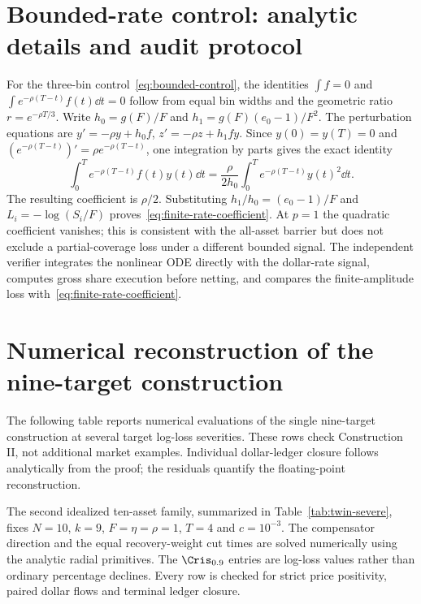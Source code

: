 \documentclass[review,hidelinks,onefignum,onetabnum]{siamonline250211}
\begin{document}
\section{Bounded-rate control: analytic details and audit protocol}\label{app:rate}
For the three-bin control~\eqref{eq:bounded-control}, the identities $\int f=0$ and $\int e^{-\rho(T-t)}f(t)\dd t=0$ follow from equal bin widths and the geometric ratio $r=e^{-\rho T/3}$. Write $h_0=g(F)/F$ and $h_1=g(F)(e_0-1)/F^2$. The perturbation equations are $y'=-\rho y+h_0 f$, $z'=-\rho z+h_1fy$. Since $y(0)=y(T)=0$ and $(e^{-\rho(T-t)})'=\rho e^{-\rho(T-t)}$, one integration by parts gives the exact identity
\begin{equation}\label{eq:ibp}
\int_0^T e^{-\rho(T-t)}f(t)y(t)\dd t
=\frac{\rho}{2h_0}\int_0^T e^{-\rho(T-t)}y(t)^2\dd t.
\end{equation}
The resulting coefficient is $\rho/2$. Substituting $h_1/h_0=(e_0-1)/F$ and $L_i=-\log(S_i/F)$ proves~\eqref{eq:finite-rate-coefficient}. At $p=1$ the quadratic coefficient vanishes; this is consistent with the all-asset barrier but does not exclude a partial-coverage loss under a different bounded signal. The independent verifier integrates the nonlinear ODE directly with the dollar-rate signal, computes gross share execution before netting, and compares the finite-amplitude loss with~\eqref{eq:finite-rate-coefficient}.

\section{Numerical reconstruction of the nine-target construction}\label{app:numerics}
The following table reports numerical evaluations of the single nine-target construction at several target log-loss severities. These rows check Construction II, not additional market examples. Individual dollar-ledger closure follows analytically from the proof; the residuals quantify the floating-point reconstruction.

The second idealized ten-asset family, summarized in
Table~\ref{tab:twin-severe}, fixes $N=10$, $k=9$,
$F=\eta=\rho=1$, $T=4$ and $c=10^{-3}$.
The compensator direction and the equal recovery-weight
cut times are solved numerically using the analytic
radial primitives. The $\Cris_{0.9}$ entries
are log-loss values rather than ordinary percentage
declines. Every row is checked for strict price
positivity, paired dollar flows and terminal ledger closure.
\end{document}
